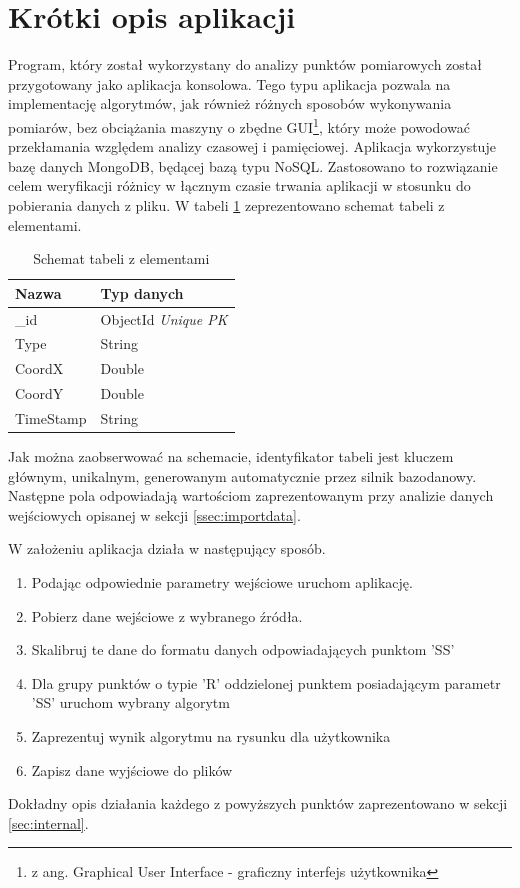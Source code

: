 \section{Krótki opis aplikacji}
\label{sec:shortdesc}
Program, który został wykorzystany do analizy punktów pomiarowych został przygotowany jako aplikacja konsolowa. Tego typu aplikacja pozwala na implementację algorytmów, jak również różnych sposobów wykonywania pomiarów, bez obciążania maszyny o zbędne GUI\footnote{z ang. Graphical User Interface - graficzny interfejs użytkownika}, który może powodować przekłamania względem analizy czasowej i pamięciowej. Aplikacja wykorzystuje bazę danych MongoDB, będącej bazą typu NoSQL. Zastosowano to rozwiązanie celem weryfikacji różnicy w łącznym czasie trwania aplikacji w stosunku do pobierania danych z pliku. W tabeli \ref{tab:nosqlschema} zeprezentowano schemat tabeli z elementami.
\begin{table}[H]
    \centering
    \begin{tabular}{|l|l|}
    \hline
    \textbf{Nazwa} & \textbf{Typ danych} \\ \hline
    \_id           & ObjectId \textit{Unique PK} \\ \hline
    Type           & String              \\ \hline
    CoordX         & Double              \\ \hline
    CoordY         & Double              \\ \hline
    TimeStamp      & String              \\ \hline
    \end{tabular}
    \caption{Schemat tabeli z elementami}
    \label{tab:nosqlschema}
\end{table}
Jak można zaobserwować na schemacie, identyfikator tabeli jest kluczem głównym, unikalnym, generowanym automatycznie przez silnik bazodanowy. Następne pola odpowiadają wartościom zaprezentowanym przy analizie danych wejściowych opisanej w sekcji \ref{ssec:importdata}.\par
W założeniu aplikacja działa w następujący sposób.
\begin{enumerate}
        \item Podając odpowiednie parametry wejściowe uruchom aplikację.
        \item Pobierz dane wejściowe z wybranego źródła.
        \item Skalibruj te dane do formatu danych odpowiadających punktom 'SS'
        \item Dla grupy punktów o typie 'R' oddzielonej punktem posiadającym parametr 'SS' uruchom wybrany algorytm
        \item Zaprezentuj wynik algorytmu na rysunku dla użytkownika
        \item Zapisz dane wyjściowe do plików
\end{enumerate}
Dokładny opis działania każdego z powyższych punktów zaprezentowano w sekcji \ref{sec:internal}.
